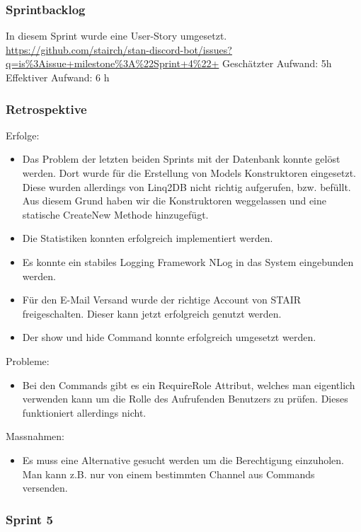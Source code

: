\documentclass[a4paper, table]{article}
\begin{document}
\subsubsection*{Sprintbacklog}
In diesem Sprint wurde eine User-Story umgesetzt.\\
\url{https://github.com/stairch/stan-discord-bot/issues?q=is%3Aissue+milestone%3A%22Sprint+4%22+}
\newline
Geschätzter Aufwand: 5h
\newline
Effektiver Aufwand: 6 h

\subsubsection*{Retrospektive}
Erfolge:
\begin{itemize}
    \item Das Problem der letzten beiden Sprints mit der Datenbank konnte gelöst werden.
    Dort wurde für die Erstellung von Models Konstruktoren eingesetzt.
    Diese wurden allerdings von Linq2DB nicht richtig aufgerufen, \gls{bzw.} befüllt.
    Aus diesem Grund haben wir die Konstruktoren weggelassen und eine statische CreateNew Methode hinzugefügt.
    \item Die Statistiken konnten erfolgreich implementiert werden.
    \item Es konnte ein stabiles Logging Framework NLog in das System eingebunden werden.
    \item Für den E-Mail Versand wurde der richtige Account von STAIR freigeschalten.
    Dieser kann jetzt erfolgreich genutzt werden.
    \item Der show und hide Command konnte erfolgreich umgesetzt werden.
\end{itemize}
Probleme:
\begin{itemize}
    \item Bei den Commands gibt es ein RequireRole Attribut, welches man eigentlich verwenden kann um die Rolle des Aufrufenden Benutzers zu prüfen.
    Dieses funktioniert allerdings nicht.
\end{itemize}
Massnahmen:
\begin{itemize}
    \item Es muss eine Alternative gesucht werden um die Berechtigung einzuholen.
    Man kann \gls{z.B.} nur von einem bestimmten Channel aus Commands versenden.
\end{itemize}

\newpage
\subsubsection{Sprint 5}
\end{document}
